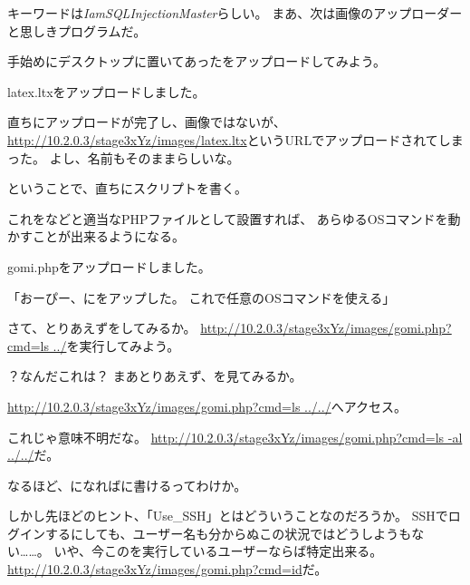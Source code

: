キーワードは\textit{IamSQLInjectionMaster}らしい。
まあ、次は画像のアップローダーと思しきプログラムだ。

手始めにデスクトップに置いてあったをアップロードしてみよう。

\begin{screen}
\centering
latex.ltxをアップロードしました。
\end{screen}

直ちにアップロードが完了し、画像ではないが、
\url{http://10.2.0.3/stage3xYz/images/latex.ltx}というURLでアップロードされてしまった。
よし、名前もそのままらしいな。

ということで、直ちにスクリプトを書く。



これをなどと適当なPHPファイルとして設置すれば、
あらゆるOSコマンドを動かすことが出来るようになる。

\begin{screen}
\centering
gomi.phpをアップロードしました。
\end{screen}

「おーぴー、にをアップした。
これで任意のOSコマンドを使える」

さて、とりあえずをしてみるか。
\url{http://10.2.0.3/stage3xYz/images/gomi.php?cmd=ls ../}を実行してみよう。


？なんだこれは？
まあとりあえず、を見てみるか。

\url{http://10.2.0.3/stage3xYz/images/gomi.php?cmd=ls ../../}へアクセス。


これじゃ意味不明だな。
\url{http://10.2.0.3/stage3xYz/images/gomi.php?cmd=ls -al ../../}だ。



なるほど、になればに書けるってわけか。

しかし先ほどのヒント、「Use\_SSH」とはどういうことなのだろうか。
SSHでログインするにしても、ユーザー名も分からぬこの状況ではどうしようもない……。
いや、今このを実行しているユーザーならば特定出来る。
\url{http://10.2.0.3/stage3xYz/images/gomi.php?cmd=id}だ。

